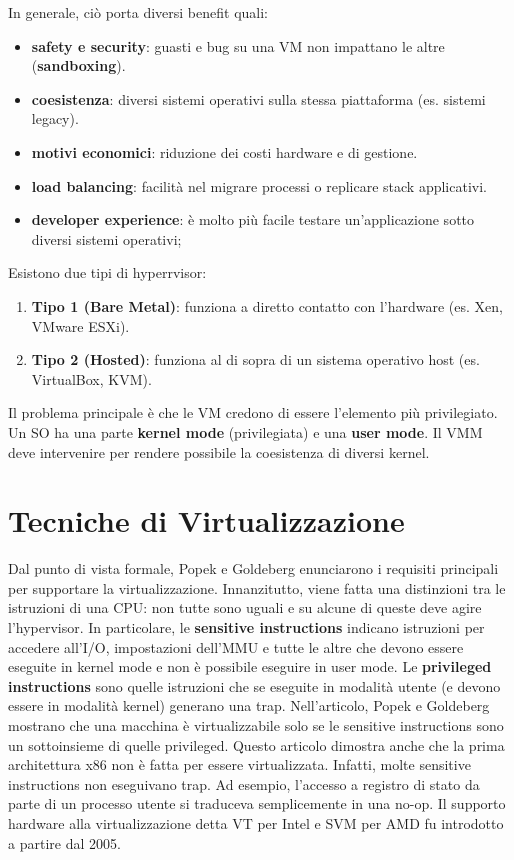 \documentclass[11pt,a4paper]{report}
\begin{document}
In generale, ciò porta diversi benefit quali:
\begin{itemize}
    \item \textbf{safety e security}: guasti e bug su una VM non impattano le altre (\textbf{sandboxing}).
    \item \textbf{coesistenza}: diversi sistemi operativi sulla stessa piattaforma (es. sistemi legacy).
    \item \textbf{motivi economici}: riduzione dei costi hardware e di gestione.
    \item \textbf{load balancing}: facilità nel migrare processi o replicare stack applicativi.
    \item \textbf{developer experience}: è molto più facile testare un'applicazione sotto diversi sistemi operativi;
\end{itemize}

Esistono due tipi di hyperrvisor:
\begin{enumerate}
    \item \textbf{Tipo 1 (Bare Metal)}: funziona a diretto contatto con l'hardware (es. Xen, VMware ESXi).
    \item \textbf{Tipo 2 (Hosted)}: funziona al di sopra di un sistema operativo host (es. VirtualBox, KVM).
\end{enumerate}

Il problema principale è che le VM credono di essere l'elemento più privilegiato. Un SO ha una parte \textbf{kernel mode} (privilegiata) e una \textbf{user mode}. Il VMM deve intervenire per rendere possibile la coesistenza di diversi kernel.

\section{Tecniche di Virtualizzazione}

Dal punto di vista formale, Popek e Goldeberg enunciarono i requisiti principali per supportare la virtualizzazione. Innanzitutto, viene fatta una distinzioni tra le istruzioni di una CPU: non tutte sono uguali e su alcune di queste deve agire l'hypervisor. In particolare, le \textbf{sensitive instructions} indicano istruzioni per accedere all'I/O, impostazioni dell'MMU e tutte le altre che devono essere eseguite in kernel mode e non è possibile eseguire in user mode. Le \textbf{privileged instructions} sono quelle istruzioni che se eseguite in modalità utente (e devono essere in modalità kernel) generano una trap. Nell'articolo, Popek e Goldeberg mostrano che una macchina è virtualizzabile solo se le sensitive instructions sono un sottoinsieme di quelle privileged. Questo articolo dimostra anche che la prima architettura x86 non è fatta per essere virtualizzata. Infatti, molte sensitive instructions non eseguivano trap. Ad esempio, l'accesso a registro di stato da parte di un processo utente si traduceva semplicemente in una no-op. Il supporto hardware alla virtualizzazione detta VT per Intel e SVM per AMD fu introdotto a partire dal 2005.
\end{document}
